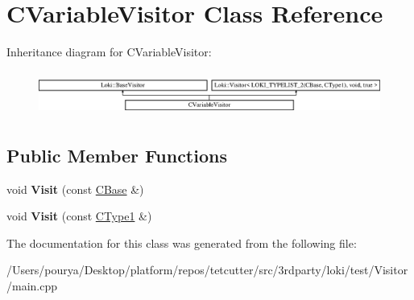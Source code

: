 \hypertarget{classCVariableVisitor}{}\section{C\+Variable\+Visitor Class Reference}
\label{classCVariableVisitor}
Inheritance diagram for C\+Variable\+Visitor\+:\begin{figure}[H]
\begin{center}
\leavevmode
\includegraphics[height=1.485411cm]{classCVariableVisitor}
\end{center}
\end{figure}
\subsection*{Public Member Functions}
\begin{DoxyCompactItemize}
\item 
\hypertarget{classCVariableVisitor_ade199edc4a2c978f84a03a02c3b111d3}{}void {\bfseries Visit} (const \hyperlink{classCBase}{C\+Base} \&)\label{classCVariableVisitor_ade199edc4a2c978f84a03a02c3b111d3}

\item 
\hypertarget{classCVariableVisitor_a6759ad6a504a05040a514b5557bee7ee}{}void {\bfseries Visit} (const \hyperlink{classCType1}{C\+Type1} \&)\label{classCVariableVisitor_a6759ad6a504a05040a514b5557bee7ee}

\end{DoxyCompactItemize}


The documentation for this class was generated from the following file\+:\begin{DoxyCompactItemize}
\item 
/\+Users/pourya/\+Desktop/platform/repos/tetcutter/src/3rdparty/loki/test/\+Visitor/main.\+cpp\end{DoxyCompactItemize}
